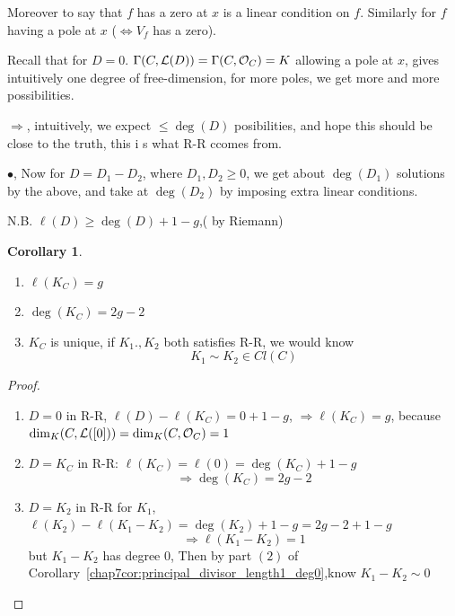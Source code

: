 \documentclass[11pt]{article}
\theoremstyle{definition}
\newtheorem{cor}[thm]{Corollary}
\newcommand{\call}{{\cal L}}
\newcommand{\calo}{{\cal O}}
\newcommand{\Lrta}{\Longrightarrow}
\newcommand{\Llrta}{\Longleftrightarrow}
\begin{document}
 Moreover to say that $f$ has a zero at $x$ is a linear condition on $f$. Similarly for $f$ having  a pole at $x$ ($\Llrta V_f$ has a zero).

 Recall that for $D=0$. $\Gamma(C,\call(D))=\Gamma(C,\calo_C)=K$ allowing a pole at $x$, gives intuitively one degree of free-dimension, for more poles, we get more and more possibilities.

 $\Lrta$, intuitively, we expect $\leq \deg(D)$ posibilities, and hope this should be close to the truth, this i s what R-R ccomes from.

 $\bullet$, Now for $D=D_1-D_2$, where $D_1,D_2\geq 0$, we get about $\deg(D_1)$ solutions by the above, and take at $\deg(D_2)$ by imposing extra linear conditions.

 N.B. $\ell(D)\geq \deg(D)+1-g$,( by Riemann)

 \begin{cor}
\begin{enumerate}[label=(\arabic*)]\ 
\item $\ell(K_C)=g$
\item $\deg(K_C)=2g-2$
\item $K_C$ is unique, if $K_1.,K_2$ both satisfies R-R, we would know
$$
K_1\sim K_2\in Cl(C)
$$
\end{enumerate}
 \end{cor}
 \begin{proof}\ 
 \begin{enumerate}[label=(\arabic*)]
 \item $D=0$ in R-R, $\ell(D)-\ell(K_C)=0+1-g$, $\Lrta \ell(K_C)=g$, because $\dim_K(C,\call([0]))=\dim_K(C,\calo_C)=1$
 \item $D=K_C$ in R-R: $\ell(K_C)=\ell(0)=\deg(K_C)+1-g$
 $$
\Lrta \deg(K_C)=2g-2
 $$
\item $D=K_2$ in R-R for $K_1$, $\ell(K_2)-\ell(K_1-K_2)=\deg(K_2)+1-g=2g-2+1-g$
$$
\Lrta \ell(K_1-K_2)=1
$$
but $K_1-K_2$ has degree $0$, Then by part $(2)$ of Corollary~\ref{chap7cor:principal_divisor_length1_deg0},know
$K_1-K_2\sim 0$
 \end{enumerate}
 \end{proof}
\end{document}
